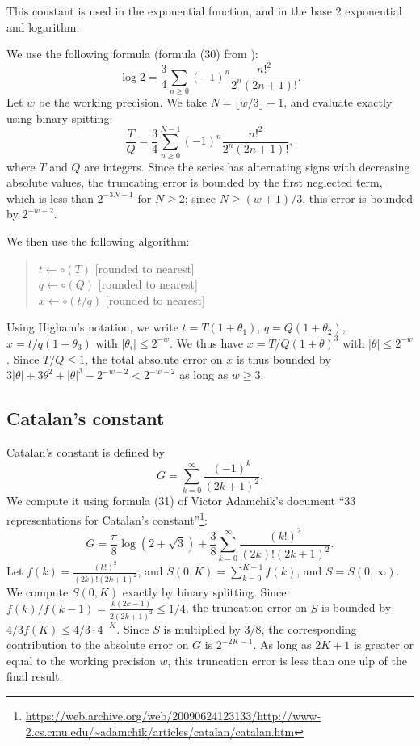 \documentclass[12pt]{amsart}
\begin{document}
This constant is used in the exponential function,
and in the base $2$ exponential and logarithm.

We use the following formula (formula (30) from \cite{GoSe04}):
\[ \log 2 = \frac{3}{4} \sum_{n \geq 0} (-1)^n \frac{{n!}^2}{2^n (2n+1)!}. \]
Let $w$ be the working precision. We take $N = \lfloor w/3 \rfloor + 1$,
and evaluate exactly using binary spitting:
\[ \frac{T}{Q}
 = \frac{3}{4} \sum_{n \geq 0}^{N-1} (-1)^n \frac{{n!}^2}{2^n (2n+1)!}, \]
where $T$ and $Q$ are integers.
Since the series has alternating signs with decreasing absolute values,
the truncating error is bounded by the first neglected term,
which is less than $2^{-3N-1}$ for $N \geq 2$;
since $N \geq (w+1)/3$, this error is bounded by $2^{-w-2}$.

We then use the following algorithm:
\begin{quote}
$t \leftarrow \circ(T)$ [rounded to nearest] \\
$q \leftarrow \circ(Q)$ [rounded to nearest] \\
$x \leftarrow \circ(t/q)$ [rounded to nearest]
\end{quote}
Using Higham's notation, we write $t = T (1+\theta_1)$,
$q = Q (1+\theta_2)$, $x = t/q (1+\theta_3)$ with $|\theta_i| \leq 2^{-w}$.
We thus have $x = T/Q (1+\theta)^3$ with $|\theta| \leq 2^{-w}$.
Since $T/Q \leq 1$, the total absolute error on $x$ is thus bounded by
$3 |\theta| + 3 \theta^2 + |\theta|^3 + 2^{-w-2} < 2^{-w+2}$ as long
as $w \geq 3$.

\subsection{Catalan's constant}

Catalan's constant is defined by
\[ G = \sum_{k=0}^{\infty} \frac{(-1)^k}{(2k+1)^2}. \]
We compute it using formula (31) of Victor Adamchik's document
``33 representations for Catalan's constant''\footnote{
\url{https://web.archive.org/web/20090624123133/http://www-2.cs.cmu.edu/~adamchik/articles/catalan/catalan.htm}}:
\[ G = \frac{\pi}{8} \log(2 + \sqrt{3}) + \frac{3}{8}
  \sum_{k=0}^{\infty} \frac{(k!)^2}{(2k)! (2k+1)^2}. \]
Let $f(k) = \frac{(k!)^2}{(2k)! (2k+1)^2}$, and
$S(0,K) = \sum_{k=0}^{K-1} f(k)$, and $S = S(0, \infty)$.
We compute $S(0,K)$
exactly by binary splitting.
Since $f(k)/f(k-1) = \frac{k (2k-1)}{2 (2k+1)^2} \leq 1/4$,
the truncation error on $S$ is bounded by $4/3 f(K) \leq 4/3 \cdot 4^{-K}$.
Since $S$ is multiplied by $3/8$, the corresponding contribution to the
absolute error on $G$ is $2^{-2K-1}$.
As long as $2K + 1$ is greater or equal to the working precision $w$, this
truncation error is less than one ulp of the final result.
\end{document}
